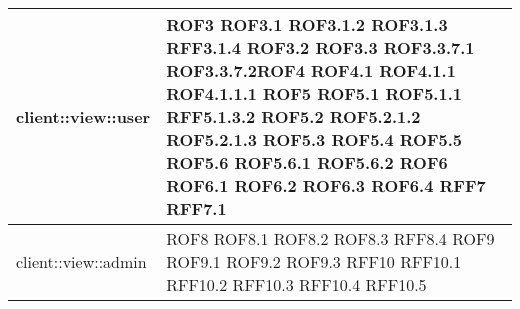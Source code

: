 \begin{center}
\begin{longtable}{| p{9cm} | p{4cm} |}
client::view::user  &  ROF3 \newline ROF3.1 \newline ROF3.1.2 \newline ROF3.1.3 \newline RFF3.1.4 \newline ROF3.2 \newline ROF3.3 \newline ROF3.3.7.1 \newline ROF3.3.7.2\newline ROF4 \newline ROF4.1 \newline ROF4.1.1 \newline ROF4.1.1.1 \newline ROF5 \newline ROF5.1 \newline ROF5.1.1 \newline RFF5.1.3.2 \newline ROF5.2 \newline ROF5.2.1.2 \newline ROF5.2.1.3 \newline ROF5.3 \newline ROF5.4 \newline ROF5.5  \newline ROF5.6 \newline ROF5.6.1 \newline ROF5.6.2 \newline ROF6 \newline ROF6.1 \newline ROF6.2 \newline ROF6.3 \newline ROF6.4 \newline RFF7 \newline RFF7.1 \newline \\
\hline
client::view::admin  &  ROF8 \newline ROF8.1 \newline ROF8.2 \newline ROF8.3 \newline RFF8.4 \newline ROF9 \newline ROF9.1 \newline ROF9.2 \newline ROF9.3 \newline RFF10 \newline RFF10.1 \newline RFF10.2 \newline RFF10.3 \newline RFF10.4 \newline RFF10.5 \newline \\

\end{longtable}
\end{center}

